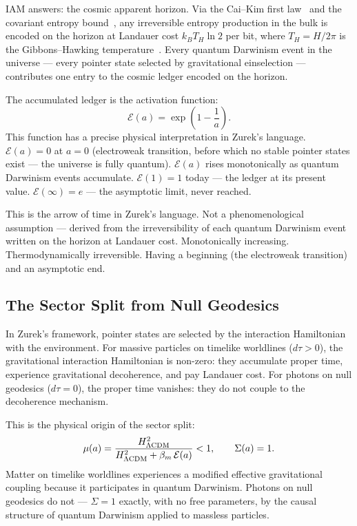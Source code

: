 \documentclass[12pt,a4paper]{article}
\begin{document}
IAM answers: the cosmic apparent horizon. Via the Cai--Kim first
law~\citep{CaiKim2005} and the covariant entropy bound~\citep{Bousso2002}, any irreversible entropy production in the bulk is
encoded on the horizon at Landauer cost $k_B T_H \ln 2$ per bit, where
$T_H = H/2\pi$ is the Gibbons--Hawking temperature~\citep{Gibbons1977}.
Every quantum Darwinism event in the universe --- every pointer state selected
by gravitational einselection --- contributes one entry to the cosmic ledger
encoded on the horizon.

The accumulated ledger is the activation function:
\begin{equation}
\mathcal{E}(a) = \exp\!\left(1 - \frac{1}{a}\right).
\label{eq:Ea}
\end{equation}
This function has a precise physical interpretation in Zurek's language.
$\mathcal{E}(a) = 0$ at $a = 0$ (electroweak transition, before which no
stable pointer states exist --- the universe is fully quantum). $\mathcal{E}(a)$
rises monotonically as quantum Darwinism events accumulate. $\mathcal{E}(1) = 1$
today --- the ledger at its present value. $\mathcal{E}(\infty) = e$ ---
the asymptotic limit, never reached.

This is the arrow of time in Zurek's language. Not a phenomenological
assumption --- derived from the irreversibility of each quantum Darwinism
event written on the horizon at Landauer cost. Monotonically increasing.
Thermodynamically irreversible. Having a beginning (the electroweak transition)
and an asymptotic end.

\subsection{The Sector Split from Null Geodesics}

In Zurek's framework, pointer states are selected by the interaction
Hamiltonian with the environment. For massive particles on timelike worldlines
($d\tau > 0$), the gravitational interaction Hamiltonian is non-zero: they
accumulate proper time, experience gravitational decoherence, and pay Landauer
cost. For photons on null geodesics ($d\tau = 0$), the proper time vanishes:
they do not couple to the decoherence mechanism.

This is the physical origin of the sector split:
\begin{equation}
\mu(a) = \frac{H^2_{\Lambda{\rm CDM}}}{H^2_{\Lambda{\rm CDM}}
+ \beta_m\,\mathcal{E}(a)} < 1, \qquad \Sigma(a) = 1.
\label{eq:sector}
\end{equation}
Matter on timelike worldlines experiences a modified effective gravitational
coupling because it participates in quantum Darwinism. Photons on null
geodesics do not --- $\Sigma = 1$ exactly, with no free parameters, by the
causal structure of quantum Darwinism applied to massless particles.
\end{document}
